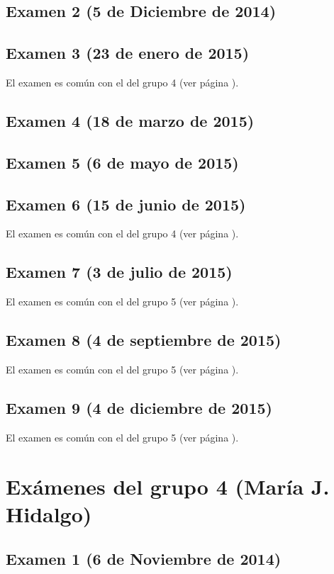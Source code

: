 \documentclass[a4paper,12pt,twoside]{book}
\begin{document}
\subsection{Examen 2 (5 de Diciembre de 2014)}
\subsection{Examen 3 (23 de enero de 2015)}
El examen es común con el del grupo 4 (ver página \pageref{examen_14_15_4_3}).
\subsection{Examen 4 (18 de marzo de 2015)}
\subsection{Examen 5 (6 de mayo de 2015)}
\subsection{Examen 6 (15 de junio de 2015)}
El examen es común con el del grupo 4 (ver página \pageref{examen_14_15_4_6}).
\subsection{Examen 7 (3 de julio de 2015)}
El examen es común con el del grupo 5 (ver página \pageref{examen_14_15_5_7}).
\subsection{Examen 8 (4 de septiembre de 2015)}
El examen es común con el del grupo 5 (ver página \pageref{examen_14_15_5_8}).
\subsection{Examen 9 (4 de diciembre de 2015)}
El examen es común con el del grupo 5 (ver página \pageref{examen_14_15_5_9}).

\section{Exámenes del grupo 4 (María J. Hidalgo)}
\subsection{Examen 1 (6 de Noviembre de 2014)}
\end{document}
